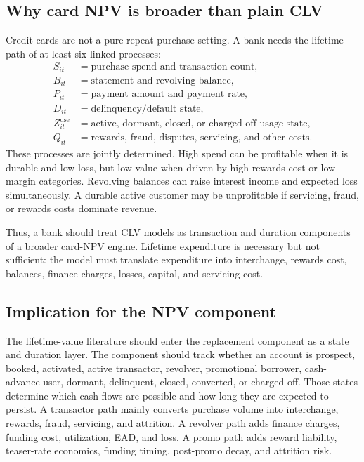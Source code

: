 \documentclass[11pt]{article}
\newcommand{\1}{\mathbf{1}}
\begin{document}
\subsection{Why card NPV is broader than plain CLV}

Credit cards are not a pure repeat-purchase setting. A bank needs the lifetime
path of at least six linked processes:
\begin{align}
  S_{it} &= \text{purchase spend and transaction count}, \\
  B_{it} &= \text{statement and revolving balance}, \\
  P_{it} &= \text{payment amount and payment rate}, \\
  D_{it} &= \text{delinquency/default state}, \\
  Z^{\mathrm{use}}_{it} &= \text{active, dormant, closed, or charged-off usage state}, \\
  Q_{it} &= \text{rewards, fraud, disputes, servicing, and other costs}.
\end{align}
These processes are jointly determined. High spend can be profitable when it is
durable and low loss, but low value when driven by high rewards cost or
low-margin categories. Revolving balances can raise interest income and
expected loss simultaneously. A durable active customer may be unprofitable if
servicing, fraud, or rewards costs dominate revenue.

Thus, a bank should treat CLV models as transaction and duration components of
a broader card-NPV engine. Lifetime expenditure is necessary but not sufficient:
the model must translate expenditure into interchange, rewards cost, balances,
finance charges, losses, capital, and servicing cost.

\subsection{Implication for the NPV component}
\label{subsec:ltv-component-implication}

The lifetime-value literature should enter the replacement component as a
state and duration layer. The component should track whether an account is
prospect, booked, activated, active transactor, revolver, promotional borrower,
cash-advance user, dormant, delinquent, closed, converted, or charged off.
Those states determine which cash flows are possible and how long they are
expected to persist. A transactor path mainly converts purchase volume into
interchange, rewards, fraud, servicing, and attrition. A revolver path adds
finance charges, funding cost, utilization, EAD, and loss. A promo path adds
reward liability, teaser-rate economics, funding timing, post-promo decay, and
attrition risk.
\end{document}
